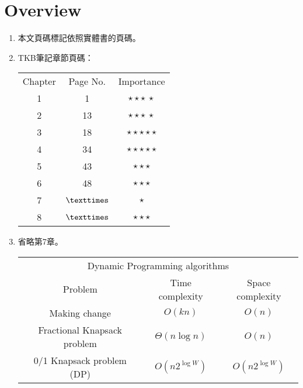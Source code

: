 \section{Overview}

\begin{enumerate}
    \item 本文頁碼標記依照實體書\cite{1}的頁碼。
    \item TKB筆記\cite{2}章節頁碼：
    \begin{table}[H]
        \centering
        \begin{tabular}{|c|c|c|}
            \hline
            Chapter & Page No. & Importance \\
            \Xhline{2\arrayrulewidth}
            1 & 1 & $\star\star\star \ \star$ \\
            \hline
            2 & 13 & $\star\star\star \ \star$ \\
            \hline
            3 & 18 & $\star\star\star\star\star$ \\
            \hline
            4 & 34 & $\star\star\star\star\star$ \\
            \hline
            5 & 43 & $\star\star\star$ \\
            \hline
            6 & 48 & $\star\star\star$ \\
            \hline
            7 & $\texttimes$ & $\star$ \\
            \hline
            8 & $\texttimes$ & $\star\star\star$ \\
            \hline
        \end{tabular}
    \end{table}
    \item 省略第7章。
    \begin{table}[H]
        \centering
        \begin{tabular}{|c|c|c|}
            \hline
            \multicolumn{3}{|c|}{Dynamic Programming algorithms} \\
            \Xhline{3\arrayrulewidth}
            Problem & Time complexity & Space complexity \\
            \Xhline{2\arrayrulewidth}
            Making change & $O(kn)$ & $O(n)$ \\
            \hline
            Fractional Knapsack problem & $\Theta(n\log n)$ & $O(n)$ \\
            \hline
            0/1 Knapsack problem (DP) & $O(n2^{\log W})$ & $O(n2^{\log W})$ \\
            \hline

\end{tabular}
\end{table}
\end{enumerate}
